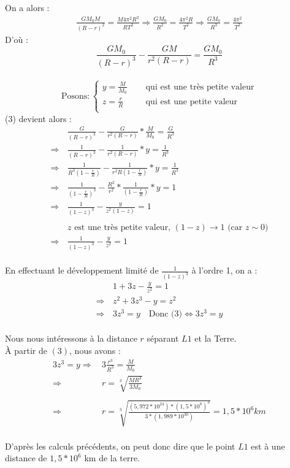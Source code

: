 \documentclass[12pt]{article}
\begin{document}
On a alors :
\begin{gather*}
\frac{GM_{0}M}{(R-r)^{2}} = \frac{M4\pi ^2 R^2}{RT^2} \Rightarrow \frac{GM_{0}}{R^2} = \frac{4 \pi ^2 R}{T^2} \Rightarrow \frac{GM_{0}}{R^3} = \frac{4 \pi ^2}{T^2}
\end{gather*}
D'où :
\begin{equation*}
\boxed{\frac{GM_{0}}{(R-r)^3} - \frac{GM}{r^2(R-r)} = \frac{GM_0}{R^3}} \tag{3}
\end{equation*} \\

\[ \text{Posons} : 
\begin{cases}
y = \frac{M}{M_0}  & \quad \text{ qui est une très petite valeur}\\
z = \frac{r}{R}  & \quad \text{ qui est une petite valeur}\\
\end{cases}
\]
(3) devient alors :
\begin{align*}
& \frac{G}{(R-r)^3} - \frac{G}{r^2 (R-r)} * \frac{M}{M_0} = \frac{G}{R^3}\\
\Rightarrow \, &\frac{1}{(R-r)^3} - \frac{1}{r^2(R-r)} * y = \frac{1}{R^3} \\
\Rightarrow \,&\frac{1}{R^3(1-\frac{r}{R})} - \frac{1}{r^2R(1-\frac{r}{R})}*y = \frac{1}{R^3}  \\
\Rightarrow \,&\frac{1}{(1-\frac{r}{R})^3} - \frac{R^2}{r^2} * \frac{1}{(1-\frac{r}{R})}*y= 1 \\
\Rightarrow \,&\frac{1}{(1-z)^3}-\frac{y}{z^{2}(1-z)} = 1 \\ \\
&z \text{ est une très petite valeur, }(1-z) \rightarrow 1 \text{ (car } z \sim 0 \text{)}  \\
\Rightarrow \,&\frac{1}{(1-z)^3} -  \frac{y}{z^2} = 1
\end{align*} \\

En effectuant le développement limité de $\frac{1}{(1-z)^3}$ à l'ordre 1, on a : 
\begin{align*}
&1+3z-\frac{y}{z^2} = 1 \\
\Rightarrow \, &z^2 + 3z^3 -y =z^2 \\
\Rightarrow \, &\boxed{3z^3 = y} \quad \text{Donc (3)} \Leftrightarrow 3z^3 = y 
\end{align*} \\
Nous nous intéressons à la distance $r$ séparant $L1$ et la Terre. \\
À partir de $(3)$, nous avons : \\
\begin{align*}
3z^3 = y \Rightarrow \, &3\frac{r^3}{R^3} = \frac{M}{M_{0}} \\
\Rightarrow \, &\boxed{r = \sqrt[3]{\frac{MR^3}{3M_0}}} \\ \\
\Rightarrow \, &\boxed{r = \sqrt[3]{\frac{(5,972*10^{24})*(1,5*10^8)^3}{3*(1,989*10^{30})}} = 1,5*10^{6} km}
\end{align*} \\
D'après les calculs précédents, on peut donc dire que le point $L1$ est à une distance de $1,5*10^6$ km de la terre.\pagebreak
\end{document}
